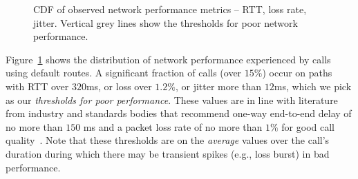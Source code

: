 \begin{figure}[t!]
\centering
{}
\caption{CDF of observed network performance metrics -- 
RTT, loss rate, jitter. Vertical grey lines show the thresholds 
for poor network performance.}
\label{fig:perf-cdf}
\end{figure}

Figure~\ref{fig:perf-cdf} shows the distribution of network 
performance experienced by calls   using default routes. 
A significant fraction of calls (over $15\%$) occur on paths with 
RTT over $320$ms, or loss over $1.2\%$, or jitter more than 
$12$ms, which we pick as our {\em thresholds for 
poor performance}. %
These values are in line with literature from industry 
and standards bodies that recommend one-way end-to-end 
delay of no more than $150$ ms and a packet loss rate of 
no more than $1\%$ for good call quality~\cite{cisco-voip, itu}. 
Note that these thresholds are on the {\em average} 
values over the call's duration during which there may 
be transient spikes (e.g., loss burst) in bad performance.

